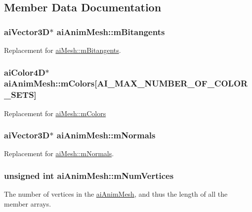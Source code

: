 \subsection{Member Data Documentation}
\hypertarget{structai_anim_mesh_a7d60acf4d2b4b59dcc6c88956bfae85f}{
\subsubsection[{m\-Bitangents}]{ {\bf ai\-Vector3\-D}$\ast$ ai\-Anim\-Mesh\-::m\-Bitangents}}\label{structai_anim_mesh_a7d60acf4d2b4b59dcc6c88956bfae85f}
Replacement for \hyperlink{structai_mesh_ab2a81bfe1731f01271ebab274a8f01c4}{ai\-Mesh\-::m\-Bitangents}. \hypertarget{structai_anim_mesh_a4f062d9fac71c6b367fdf0f8638e1ca5}{
\subsubsection[{m\-Colors}]{ {\bf ai\-Color4\-D}$\ast$ ai\-Anim\-Mesh\-::m\-Colors\mbox{[}{\bf A\-I\-\_\-\-M\-A\-X\-\_\-\-N\-U\-M\-B\-E\-R\-\_\-\-O\-F\-\_\-\-C\-O\-L\-O\-R\-\_\-\-S\-E\-T\-S}\mbox{]}}}\label{structai_anim_mesh_a4f062d9fac71c6b367fdf0f8638e1ca5}
Replacement for \hyperlink{structai_mesh_ad9215f67bd0c2277b10775a8adb66b96}{ai\-Mesh\-::m\-Colors} \hypertarget{structai_anim_mesh_a64a07a8c5c419b1e006c5302bca4d334}{
\subsubsection[{m\-Normals}]{ {\bf ai\-Vector3\-D}$\ast$ ai\-Anim\-Mesh\-::m\-Normals}}\label{structai_anim_mesh_a64a07a8c5c419b1e006c5302bca4d334}
Replacement for \hyperlink{structai_mesh_aec81b496b4d93838cef038933dabe9b9}{ai\-Mesh\-::m\-Normals}. \hypertarget{structai_anim_mesh_a6bb0d45317a1bbea7f2b7f8191d0c436}{
\subsubsection[{m\-Num\-Vertices}]{\setlength{\rightskip}{0pt plus 5cm}unsigned {\bf int} ai\-Anim\-Mesh\-::m\-Num\-Vertices}}\label{structai_anim_mesh_a6bb0d45317a1bbea7f2b7f8191d0c436}
The number of vertices in the \hyperlink{structai_anim_mesh}{ai\-Anim\-Mesh}, and thus the length of all the member arrays.

